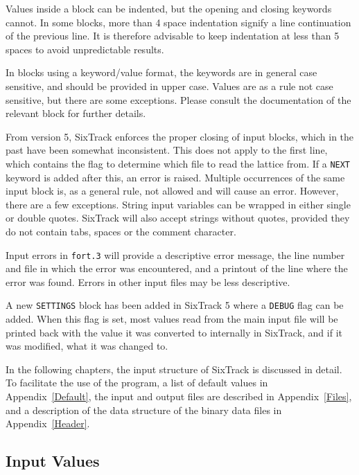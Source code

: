 Values inside a block can be indented, but the opening and closing keywords cannot.
In some blocks, more than 4 space indentation signify a line continuation of the previous line.
It is therefore advisable to keep indentation at less than 5 spaces to avoid unpredictable results.

In blocks using a keyword/value format, the keywords are in general case sensitive, and should be provided in upper case.
Values are as a rule not case sensitive, but there are some exceptions.
Please consult the documentation of the relevant block for further details.

From version 5, SixTrack enforces the proper closing of input blocks, which in the past have been somewhat inconsistent.
This does not apply to the first line, which contains the flag to determine which file to read the lattice from.
If a \texttt{NEXT} keyword is added after this, an error is raised.
Multiple occurrences of the same input block is, as a general rule, not allowed and will cause an error.
However, there are a few exceptions.
String input variables can be wrapped in either single or double quotes.
SixTrack will also accept strings without quotes, provided they do not contain tabs, spaces or the comment character.

Input errors in \texttt{fort.3} will provide a descriptive error message, the line number and file in which the error was encountered, and a printout of the line where the error was found.
Errors in other input files may be less descriptive.

A new \texttt{SETTINGS} block has been added in SixTrack 5 where a \texttt{DEBUG} flag can be added.
When this flag is set, most values read from the main input file will be printed back with the value it was converted to internally in SixTrack, and if it was modified, what it was changed to.

In the following chapters, the input structure of SixTrack is discussed in detail.
To facilitate the use of the program, a list of default values in Appendix~\ref{Default}, the input and output files are described in Appendix~\ref{Files}, and a description of the data structure of the binary data files in Appendix~\ref{Header}.

\subsection{Input Values} \label{sec:invals}

